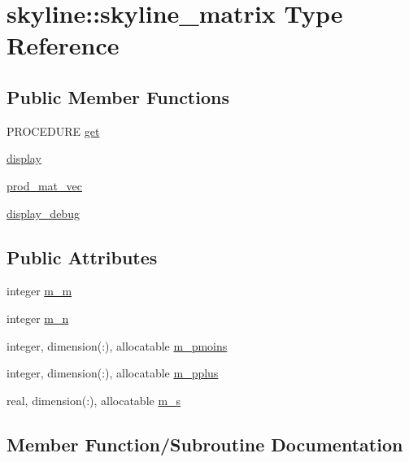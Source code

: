 \hypertarget{structskyline_1_1skyline__matrix}{}\section{skyline\+:\+:skyline\+\_\+matrix Type Reference}
\label{structskyline_1_1skyline__matrix}
\subsection*{Public Member Functions}
\begin{DoxyCompactItemize}
\item 
P\+R\+O\+C\+E\+D\+U\+RE \hyperlink{structskyline_1_1skyline__matrix_a3b8d47decbf713171eb82625a51fbcd1}{get}
\item 
\hyperlink{structskyline_1_1skyline__matrix_ab03e03935f5904ed8f75d303c0bd291a}{display}
\item 
\hyperlink{structskyline_1_1skyline__matrix_ae32226cd0b3b93e3cb1ec3757642eb5e}{prod\+\_\+mat\+\_\+vec}
\item 
\hyperlink{structskyline_1_1skyline__matrix_a7b5a1b7bffbef0cd9a1f39812a95c835}{display\+\_\+debug}
\end{DoxyCompactItemize}
\subsection*{Public Attributes}
\begin{DoxyCompactItemize}
\item 
integer \hyperlink{structskyline_1_1skyline__matrix_a5a4b43ae751ef50d42248106ff639e9b}{m\+\_\+m}
\item 
integer \hyperlink{structskyline_1_1skyline__matrix_a7ba587a5f9c0ecbbf2b4f66210354c69}{m\+\_\+n}
\item 
integer, dimension(\+:), allocatable \hyperlink{structskyline_1_1skyline__matrix_a82b8f867967e8fe2bc7106e2e41025fc}{m\+\_\+pmoins}
\item 
integer, dimension(\+:), allocatable \hyperlink{structskyline_1_1skyline__matrix_aece459142907a20cb11f6b881f21e3a2}{m\+\_\+pplus}
\item 
real, dimension(\+:), allocatable \hyperlink{structskyline_1_1skyline__matrix_ad8c333b80461be7faf047a603edd445a}{m\+\_\+s}
\end{DoxyCompactItemize}


\subsection{Member Function/\+Subroutine Documentation}
\mbox{\label{structskyline_1_1skyline__matrix_ab03e03935f5904ed8f75d303c0bd291a}} 

